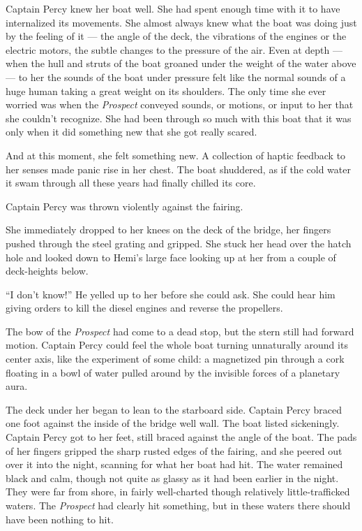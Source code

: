 \documentclass[]{scrbook}
\begin{document}
Captain Percy knew her boat well. She had spent enough time with it to
have internalized its movements. She almost always knew what the boat
was doing just by the feeling of it --- the angle of the deck, the
vibrations of the engines or the electric motors, the subtle changes to
the pressure of the air. Even at depth --- when the hull and struts of
the boat groaned under the weight of the water above --- to her the
sounds of the boat under pressure felt like the normal sounds of a huge
human taking a great weight on its shoulders. The only time she ever
worried was when the \emph{Prospect} conveyed sounds, or motions, or
input to her that she couldn't recognize. She had been through so much
with this boat that it was only when it did something new that she got
really scared.

And at this moment, she felt something new. A collection of haptic
feedback to her senses made panic rise in her chest. The boat shuddered,
as if the cold water it swam through all these years had finally chilled
its core.

Captain Percy was thrown violently against the fairing.

She immediately dropped to her knees on the deck of the bridge, her
fingers pushed through the steel grating and gripped. She stuck her head
over the hatch hole and looked down to Hemi's large face looking up at
her from a couple of deck-heights below.

``I don't know!'' He yelled up to her before she could ask. She could
hear him giving orders to kill the diesel engines and reverse the
propellers.

The bow of the \emph{Prospect} had come to a dead stop, but the stern
still had forward motion. Captain Percy could feel the whole boat
turning unnaturally around its center axis, like the experiment of some
child: a magnetized pin through a cork floating in a bowl of water
pulled around by the invisible forces of a planetary aura.

The deck under her began to lean to the starboard side. Captain Percy
braced one foot against the inside of the bridge well wall. The boat
listed sickeningly. Captain Percy got to her feet, still braced against
the angle of the boat. The pads of her fingers gripped the sharp rusted
edges of the fairing, and she peered out over it into the night,
scanning for what her boat had hit. The water remained black and calm,
though not quite as glassy as it had been earlier in the night. They
were far from shore, in fairly well-charted though relatively
little-trafficked waters. The \emph{Prospect} had clearly hit something,
but in these waters there should have been nothing to hit.
\end{document}
